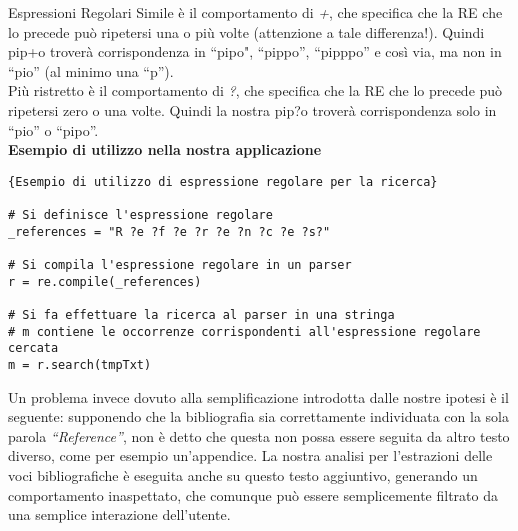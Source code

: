 \begin{subsubsection}{Espressioni Regolari}
Simile è il comportamento di \textit{+}, che specifica che la RE che lo precede può ripetersi una o più volte (attenzione a tale differenza!). Quindi pip+o troverà corrispondenza in ``pipo", ``pippo'', ``pipppo'' e così via, ma non in ``pio'' (al minimo una ``p'').\\

Più ristretto è il comportamento di \textit{?}, che specifica che la RE che lo precede può ripetersi zero o una volte. Quindi la nostra pip?o troverà corrispondenza solo in ``pio'' o ``pipo''.\\

\textbf{Esempio di utilizzo nella nostra applicazione}
\begin{lstlisting}[frame=r,caption=Esempio di utilizzo di espressione regolare per la ricerca ,breaklines=true,basicstyle=\small]{Esempio di utilizzo di espressione regolare per la ricerca}

# Si definisce l'espressione regolare
_references = "R ?e ?f ?e ?r ?e ?n ?c ?e ?s?"

# Si compila l'espressione regolare in un parser
r = re.compile(_references)

# Si fa effettuare la ricerca al parser in una stringa
# m contiene le occorrenze corrispondenti all'espressione regolare cercata
m = r.search(tmpTxt)
\end{lstlisting}

\end{subsubsection}

Un problema invece dovuto alla semplificazione introdotta dalle nostre ipotesi è il seguente: supponendo che la bibliografia sia correttamente individuata con la sola parola \textit{``Reference''}, non è detto che questa non possa essere seguita da altro testo diverso, come per esempio un'appendice. La nostra analisi per l'estrazioni delle voci bibliografiche è eseguita anche su questo testo aggiuntivo, generando un comportamento inaspettato, che comunque può essere semplicemente filtrato da una semplice interazione dell'utente.


